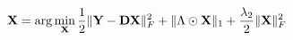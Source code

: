 \documentclass{standalone}
\begin{document}
$ \displaystyle
\mathbf{X} = \arg\min_{\mathbf{X}} \frac{1}{2} \|\mathbf{Y} - \mathbf{D} \mathbf{X}\|_F^2 + \|\Lambda\odot\mathbf{X}\|_1 + \frac{\lambda_2}{2} \|\mathbf{X}\|_F^2
$
\end{document}
